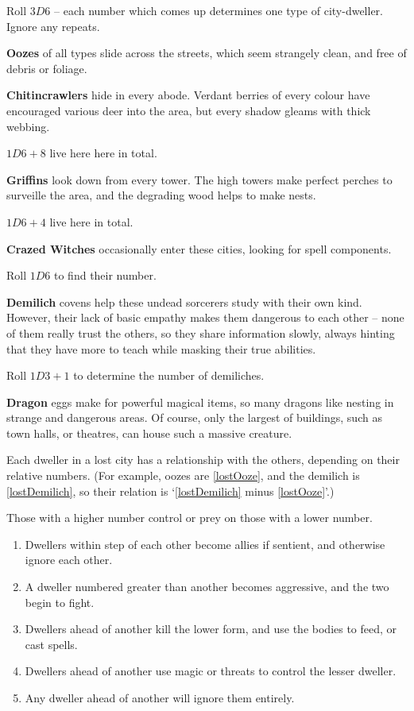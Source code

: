\begin{multicols}{2}
Roll $3D6$ -- each number which comes up determines one type of city-dweller.
Ignore any repeats.

\begin{dlist}
  \item\label{lostOoze}
  \textbf{Oozes} of all types slide across the streets, which seem strangely clean, and free of debris or foliage.
  \item
  \textbf{Chitincrawlers} hide in every abode.
  Verdant berries of every colour have encouraged various deer into the area, but every shadow gleams with thick webbing.

  $1D6+8$ live here here in total.
  \item
  \textbf{Griffins} look down from every tower.
  The high towers make perfect perches to surveille the area, and the degrading wood helps to make nests.

  $1D6+4$ live here in total.
  \item
  \textbf{Crazed Witches} occasionally enter these cities, looking for spell components.

  Roll $1D6$ to find their number.
  \item\label{lostDemilich}
  \textbf{Demilich} covens help these undead sorcerers study with their own kind.
  However, their lack of basic empathy makes them dangerous to each other -- none of them really trust the others, so they share information slowly, always hinting that they have more to teach while masking their true abilities.

  Roll $1D3 + 1$ to determine the number of demiliches.
  \item
  \textbf{Dragon} eggs make for powerful magical items, so many dragons like nesting in strange and dangerous areas.
  Of course, only the largest of buildings, such as town halls, or theatres, can house such a massive creature.
\end{dlist}

Each dweller in a lost city has a relationship with the others, depending on their relative numbers.
(For example, oozes are \ref{lostOoze}, and the demilich is \ref{lostDemilich}, so their relation is `\ref{lostDemilich} minus \ref{lostOoze}'.)

Those with a higher number control or prey on those with a lower number.

\begin{enumerate}
  \item
  Dwellers within  step of each other become allies if sentient, and otherwise ignore each other.
  \item
  A dweller numbered  greater than another becomes aggressive, and the two begin to fight.
  \item
  Dwellers  ahead of another kill the lower form, and use the bodies to feed, or cast spells.
  \item
  Dwellers  ahead of another use magic or threats to control the lesser dweller.
  \item
  Any dweller  ahead of another will ignore them entirely.
\end{enumerate}


\end{multicols}
